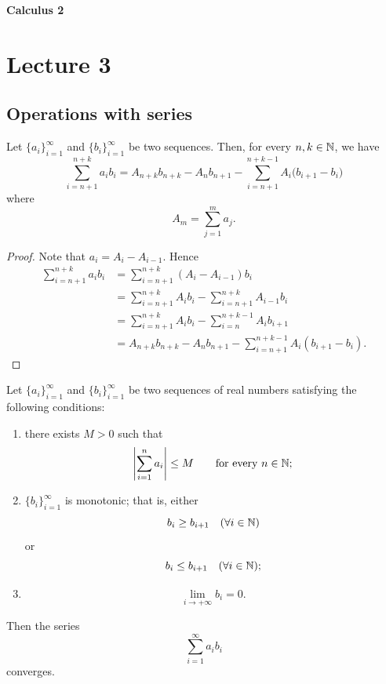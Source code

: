 
{\large\bfseries Calculus 2}

\section{Lecture 3}
\subsection*{Operations with series}

\begin{claim}\label{claim:3.1}
Let $\{a_i\}_{i=1}^{\infty}$ and $\{b_i\}_{i=1}^{\infty}$ be two sequences. Then, for every $n,k\in\mathbb{N}$, we have
\[
\boxed{
\sum_{i=n+1}^{n+k}a_i b_i
=A_{n+k}b_{n+k}-A_n b_{n+1}
-\sum_{i=n+1}^{n+k-1}A_i\bigl(b_{i+1}-b_i\bigr)
}
\]
where
\[
A_m=\sum_{j=1}^{m}a_j.
\]
\end{claim}

\begin{proof}
Note that $a_i=A_i-A_{i-1}$. Hence
\begin{align*}
\sum_{i=n+1}^{n+k}a_i b_i
&=\sum_{i=n+1}^{n+k}(A_i-A_{i-1})b_i\\
&=\sum_{i=n+1}^{n+k}A_i b_i-\sum_{i=n+1}^{n+k}A_{i-1}b_i\\
&=\sum_{i=n+1}^{n+k}A_i b_i-\sum_{i=n}^{n+k-1}A_i b_{i+1}\\
&=A_{n+k}b_{n+k}-A_n b_{n+1}
-\sum_{i=n+1}^{n+k-1}A_i(b_{i+1}-b_i).
\end{align*}
\end{proof}

\begin{claim}\label{claim:3.2}
Let $\{a_i\}_{i=1}^{\infty}$ and $\{b_i\}_{i=1}^{\infty}$ be two sequences of real numbers satisfying the following conditions:
\begin{enumerate}[label=\alph*)]
\item\label{item:claim:3.2:a} there exists $M>0$ such that
\[
\left|\sum_{i=1}^{n}a_i\right|\le M
\qquad\text{for every }n\in\mathbb{N};
\]
\item\label{item:claim:3.2:b} $\{b_i\}_{i=1}^{\infty}$ is monotonic; that is, either
\[
b_i\ge b_{i+1}\quad(\forall i\in\mathbb{N})
\]
or
\[
b_i\le b_{i+1}\quad(\forall i\in\mathbb{N});
\]
\item\label{item:claim:3.2:c}
\[
\lim_{i\to+\infty}b_i=0.
\]
\end{enumerate}
Then the series
\[
\sum_{i=1}^{\infty}a_i b_i
\]
converges.
\end{claim}


